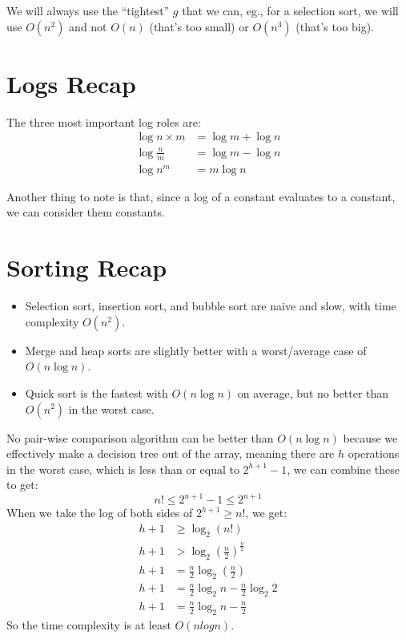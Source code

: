 We will always use the ``tightest'' \(g\) that we can, eg., for a selection sort, we will use \(O(n^2)\) and not \(O(n)\) (that's too small) or \(O(n^{3})\) (that's too big).

\section{Logs Recap}\label{sec:logs_recap}

The three most important log roles are:
\begin{align*}
    \log n \times m  & = \log m + \log n \\
    \log \frac{n}{m} & = \log m - \log n \\
    \log n^{m}       & =m \log n
\end{align*}
\begin{note}
    Another thing to note is that, since a log of a constant evaluates to a constant, we can consider them constants.
\end{note}

\section{Sorting Recap}\label{sec:sorting_recap}

\begin{itemize}
    \item Selection sort, insertion sort, and bubble sort are naive and slow, with time complexity \(O(n^2)\).
    \item Merge and heap sorts are slightly better with a worst/average case of \(O(n\log n)\).
    \item Quick sort is the fastest with \(O(n \log n)\) on average, but no better than \(O(n^2)\) in the worst case.
\end{itemize}

No pair-wise comparison algorithm can be better than \(O(n \log n)\) because we effectively make a decision tree out of the array, meaning there are \(h\) operations in the worst case, which is less than or equal to \(2^{h+1}-1\), we can combine these to get:
\[
    n! \leq 2^{n+1}-1 \leq 2^{n+1}
\]
When we take the log of both sides of \(2^{h+1} \geq n!\), we get:
\begin{align*}
    h+1 & \geq \log_2(n!)                             \\
    h+1 & > \log_2 (\frac{n}{2})^{\frac{n}{2}}        \\
    h+1 & = \frac{n}{2}\log_2(\frac{n}{2})            \\
    h+1 & = \frac{n}{2}\log_2 n - \frac{n}{2}\log_2 2 \\
    h+1 & = \frac{n}{2}\log_2 n - \frac{n}{2}
\end{align*}
So the time complexity is at least \(O (n log n)\).

